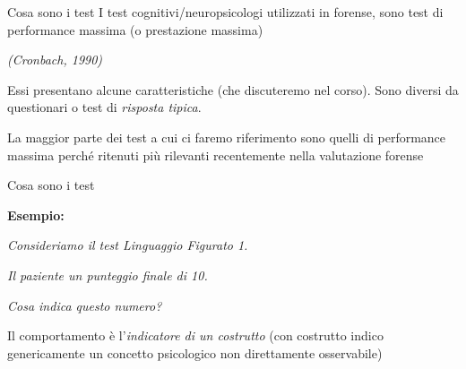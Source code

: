 \documentclass[
  ignorenonframetext,
]{beamer}
\begin{document}
\begin{frame}{Cosa sono i test}
\label{cosa-sono-i-test}
I test cognitivi/neuropsicologi utilizzati in forense, sono test di
performance massima (o prestazione massima)

\begin{flushright}
  \emph{(Cronbach, 1990)}
\end{flushright}
\pause
\vspace{2em}

Essi presentano alcune caratteristiche (che discuteremo nel corso). Sono
diversi da questionari o test di \emph{risposta tipica}. \pause
\vspace{2em}

\begin{center}
La maggior parte dei test a cui ci faremo riferimento sono quelli di performance massima perché ritenuti più rilevanti recentemente nella valutazione forense
\end{center}
\end{frame}

\begin{frame}{Cosa sono i test}
\label{cosa-sono-i-test-1}
\begin{center}
  \textbf{Esempio:}
\end{center}
\vspace{2em}

\emph{Consideriamo il test Linguaggio Figurato 1.}

\emph{Il paziente un punteggio finale di 10.}

\emph{Cosa indica questo numero?} \pause \vspace{2em}

Il comportamento è l'\emph{indicatore di un costrutto} (con costrutto
indico genericamente un concetto psicologico non direttamente
osservabile)
\end{frame}
\end{document}
